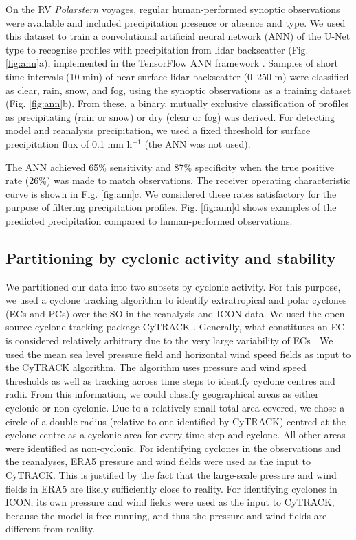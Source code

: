 \documentclass[12pt,a4paper]{article}
\begin{document}
On the RV \emph{Polarstern} voyages, regular human-performed synoptic
observations were available and included precipitation presence or absence and
type. We used this dataset to train a convolutional artiﬁcial neural network
(ANN) of the U-Net type \citep{ronneberger2015} to recognise profiles with
precipitation from lidar backscatter (Fig. \ref{fig:ann}a), implemented in the
TensorFlow ANN framework \citep{tensorflow}. Samples of short time intervals
(10 min) of near-surface lidar backscatter (0–250 m) were classified as clear,
rain, snow, and fog, using the synoptic observations as a training dataset
(Fig.  \ref{fig:ann}b). From these, a binary, mutually exclusive classification
of profiles as precipitating (rain or snow) or dry (clear or fog) was derived.
For detecting model and reanalysis precipitation, we used a fixed threshold for
surface precipitation flux of 0.1 mm h$^{-1}$ (the ANN was not used).

The ANN achieved 65\% sensitivity and 87\% speciﬁcity when the true positive
rate (26\%) was made to match observations. The receiver operating
characteristic curve is shown in Fig. \ref{fig:ann}c. We considered these rates
satisfactory for the purpose of filtering precipitation profiles. Fig.
\ref{fig:ann}d shows examples of the predicted precipitation compared to
human-performed observations.

\subsection{Partitioning by cyclonic activity and stability}

We partitioned our data into two subsets by cyclonic activity. For this
purpose, we used a cyclone tracking algorithm to identify extratropical and
polar cyclones (ECs and PCs) over the SO in the reanalysis and ICON data. We
used the open source cyclone tracking package CyTRACK
\citep{perez-alarcon2024}.  Generally, what constitutes an EC is considered
relatively arbitrary due to the very large variability of ECs \citep{neu2013}.
We used the mean sea level pressure field and horizontal wind speed fields as
input to the CyTRACK algorithm. The algorithm uses pressure and wind speed
thresholds as well as tracking across time steps to identify cyclone centres
and radii. From this information, we could classify geographical areas as
either cyclonic or non-cyclonic. Due to a relatively small total area covered,
we chose a circle of a double radius (relative to one identified by CyTRACK)
centred at the cyclone centre as a cyclonic area for every time step and
cyclone. All other areas were identified as non-cyclonic. For identifying
cyclones in the observations and the reanalyses, ERA5 pressure and wind fields
were used as the input to CyTRACK.  This is justified by the fact that the
large-scale pressure and wind fields in ERA5 are likely sufficiently close to
reality. For identifying cyclones in ICON, its own pressure and wind fields
were used as the input to CyTRACK, because the model is free-running, and thus
the pressure and wind fields are different from reality.
\end{document}
